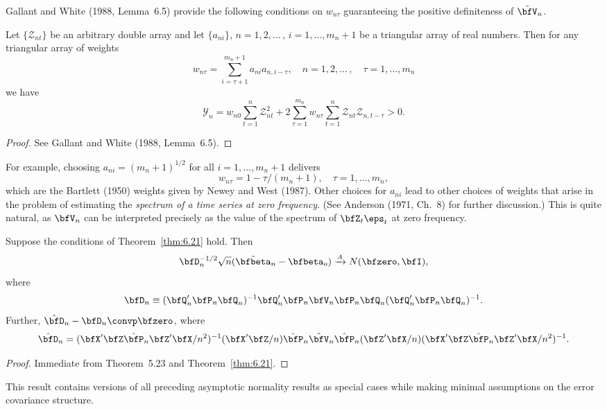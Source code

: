 Gallant and White (1988, Lemma~6.5) provide the following conditions on $w_{n\tau}$ guaranteeing the positive definiteness of $\tilde{\bfV}_n$.

\begin{lemma}\label{lem:6.22}
Let $\{\mathcal{Z}_{nt}\}$ be an arbitrary double array and let $\{a_{ni}\}$, $n = 1,2,\ldots$\,, $i = 1,\ldots,m_n+1$ be a triangular array of real numbers. Then for any triangular array of weights
\[
  w_{n\tau} = \sum_{i=\tau+1}^{m_n+1}a_{ni}a_{n,i-\tau}, \quad n = 1,2,\ldots\,, \quad \tau = 1,\ldots,m_n
\]
we have
\[
  \mathcal{Y}_n = w_{n0}\sum_{t=1}^{n}\mathcal{Z}_{nt}^2 + 2\sum_{\tau=1}^{m_n}w_{n\tau}\sum_{t=1}^{n}\mathcal{Z}_{nt}\mathcal{Z}_{n,t-\tau} > 0.
\]
\end{lemma}

\begin{proof}
See Gallant and White (1988, Lemma~6.5).
\end{proof}

For example, choosing $a_{ni} = (m_n+1)^{1/2}$ for all $i = 1,\ldots,m_n+1$ delivers
\[
  w_{n\tau} = 1 - \tau/(m_n+1), \quad \tau = 1,\ldots,m_n,
\]
which are the Bartlett (1950) weights given by Newey and West (1987). Other choices for $a_{ni}$ lead to other choices of weights that arise in the problem of estimating the \emph{spectrum of a time series at zero frequency}. (See Anderson (1971, Ch.~8) for further discussion.) This is quite natural, as $\bfV_n$ can be interpreted precisely as the value of the spectrum of $\bfZ_t\eps_t$ at zero frequency.

\begin{corollary}\label{cor:6.23}
Suppose the conditions of Theorem~\ref{thm:6.21} hold. Then
\[
  \bfD_n^{-1/2}\sqrt{n}(\tilde{\bfbeta}_n - \bfbeta_o) \xrightarrow{A} N(\bfzero,\bfI),
\]
where
\[
  \bfD_n \equiv (\bfQ_n'\bfP_n\bfQ_n)^{-1}\bfQ_n'\bfP_n\bfV_n\bfP_n\bfQ_n(\bfQ_n'\bfP_n\bfQ_n)^{-1}.
\]
Further, $\hat{\bfD}_n - \bfD_n \convp \bfzero$, where
\[
  \hat{\bfD}_n = (\bfX'\bfZ\hat{\bfP}_n\bfZ'\bfX/n^2)^{-1}(\bfX'\bfZ/n)\hat{\bfP}_n\tilde{\bfV}_n\hat{\bfP}_n(\bfZ'\bfX/n)(\bfX'\bfZ\hat{\bfP}_n\bfZ'\bfX/n^2)^{-1}.
\]
\end{corollary}

\begin{proof}
Immediate from Theorem~5.23 and Theorem~\ref{thm:6.21}.
\end{proof}

This result contains versions of all preceding asymptotic normality results as special cases while making minimal assumptions on the error covariance structure.

